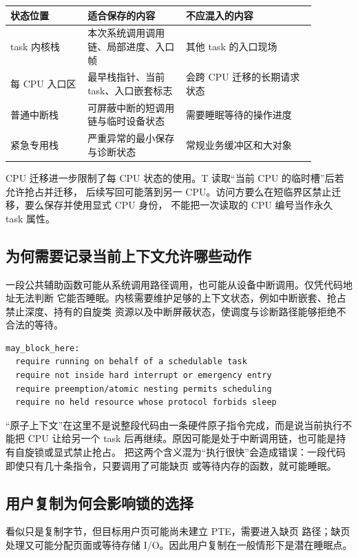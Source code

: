 \begin{longtable}{|L{0.22\linewidth}|L{0.29\linewidth}|L{0.37\linewidth}|}
\hline
状态位置 & 适合保存的内容 & 不应混入的内容 \\ \hline
task 内核栈 & 本次系统调用调用链、局部进度、入口帧 & 其他 task 的入口现场 \\ \hline
每 CPU 入口区 & 最早栈指针、当前 task、入口嵌套标志 & 会跨 CPU 迁移的长期请求状态 \\ \hline
普通中断栈 & 可屏蔽中断的短调用链与临时设备状态 & 需要睡眠等待的操作进度 \\ \hline
紧急专用栈 & 严重异常的最小保存与诊断状态 & 常规业务缓冲区和大对象 \\ \hline
\end{longtable}

CPU 迁移进一步限制了每 CPU 状态的使用。T 读取“当前 CPU 的临时槽”后若允许抢占并迁移，
后续写回可能落到另一 CPU。访问方要么在短临界区禁止迁移，要么保存并使用显式 CPU 身份，
不能把一次读取的 CPU 编号当作永久 task 属性。

\subsection{为何需要记录当前上下文允许哪些动作}

一段公共辅助函数可能从系统调用路径调用，也可能从设备中断调用。仅凭代码地址无法判断
它能否睡眠。内核需要维护足够的上下文状态，例如中断嵌套、抢占禁止深度、持有的自旋类
资源以及中断屏蔽状态，使调度与诊断路径能够拒绝不合法的等待。

\begin{lstlisting}
may_block_here:
  require running on behalf of a schedulable task
  require not inside hard interrupt or emergency entry
  require preemption/atomic nesting permits scheduling
  require no held resource whose protocol forbids sleep
\end{lstlisting}

“原子上下文”在这里不是说整段代码由一条硬件原子指令完成，而是说当前执行不能把 CPU
让给另一个 task 后再继续。原因可能是处于中断调用链，也可能是持有自旋锁或显式禁止抢占。
把这两个含义混为“执行很快”会造成错误：一段代码即使只有几十条指令，只要调用了可能缺页
或等待内存的函数，就可能睡眠。

\subsection{用户复制为何会影响锁的选择}

 看似只是复制字节，但目标用户页可能尚未建立 PTE，需要进入缺页
路径；缺页处理又可能分配页面或等待存储 I/O。因此用户复制在一般情形下是潜在睡眠点。

